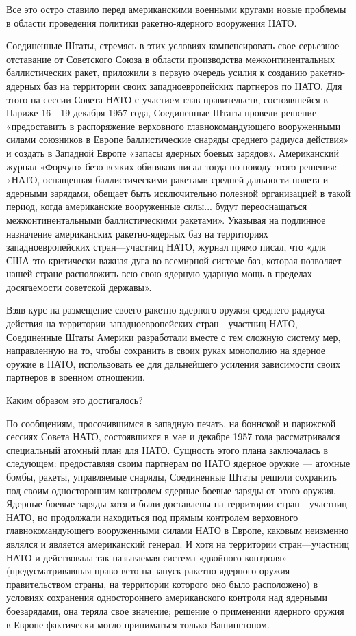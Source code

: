 \documentclass[12pt, a4paper, openany]{book}
\begin{document}
	Все это остро ставило перед американскими военными кругами новые проблемы в области проведения политики ракетно-ядерного вооружения НАТО.
	
	Соединенные Штаты, стремясь в этих условиях компенсировать свое серьезное отставание от Советского Союза в области производства межконтинентальных баллистических ракет, приложили в первую очередь усилия к созданию ракетно-ядерных баз на территории своих западноевропейских партнеров по НАТО. Для этого на сессии Совета НАТО с участием глав правительств, состоявшейся в Париже 16—19 декабря 1957 года, Соединенные Штаты провели решение — «предоставить в распоряжение верховного главнокомандующего вооруженными силами союзников в Европе баллистические снаряды среднего радиуса действия» и создать в Западной Европе «запасы ядерных боевых зарядов». Американский журнал «Форчун» безо всяких обиняков писал тогда по поводу этого решения: «НАТО, оснащенная баллистическими ракетами средней дальности полета и ядерными зарядами, обещает быть исключительно полезной организацией в такой период, когда американские вооруженные силы... будут переоснащаться межконтинентальными баллистическими ракетами». Указывая на подлинное назначение американских ракетно-ядерных баз на территориях западноевропейских стран—участниц НАТО, журнал прямо писал, что «для США это критически важная дуга во всемирной системе баз, которая позволяет нашей стране расположить всю свою ядерную ударную мощь в пределах досягаемости советской державы».
	
	Взяв курс на размещение своего ракетно-ядерного оружия среднего радиуса действия на территории западноевропейских стран—участниц НАТО, Соединенные Штаты Америки разработали вместе с тем сложную систему мер, направленную на то, чтобы сохранить в своих руках монополию на ядерное оружие в НАТО, использовать ее для дальнейшего усиления зависимости своих партнеров в военном отношении.
	
	Каким образом это достигалось?
	
	По сообщениям, просочившимся в западную печать, на боннской и парижской сессиях Совета НАТО, состоявшихся в мае и декабре 1957 года рассматривался специальный атомный план для НАТО. Сущность этого плана заключалась в следующем: предоставляя своим партнерам по НАТО ядерное оружие — атомные бомбы, ракеты, управляемые снаряды, Соединенные Штаты решили сохранить под своим односторонним контролем ядерные боевые заряды от этого оружия. Ядерные боевые заряды хотя и были доставлены на территории стран—участниц НАТО, но продолжали находиться под прямым контролем верховного главнокомандующего вооруженными силами НАТО в Европе, каковым неизменно являлся и является американский генерал. И хотя на территории стран—участниц НАТО и действовала так называемая система «двойного контроля» (предусматривавшая право вето на запуск ракетно-ядерного оружия правительством страны, на территории которого оно было расположено) в условиях сохранения одностороннего американского контроля над ядерными боезарядами, она теряла свое значение; решение о применении ядерного оружия в Европе фактически могло приниматься только Вашингтоном.
	
\end{document}

